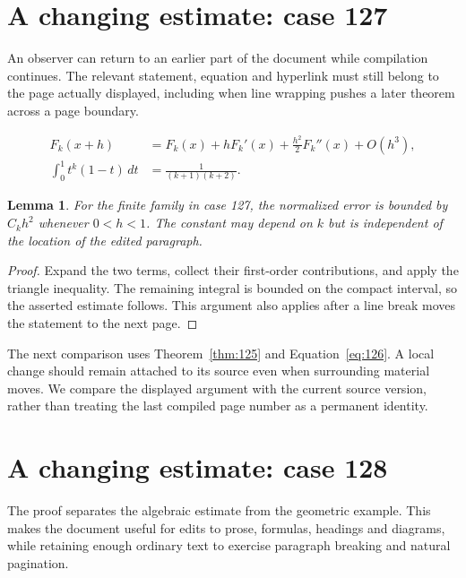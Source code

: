 \documentclass[a4paper,10pt]{article}
\newtheorem{lemma}[theorem]{Lemma}
\begin{document}
\lipsum[3]

\section{A changing estimate: case 127}\label{unit:126}
An observer can return to an earlier part of the document while compilation continues. The relevant statement, equation and hyperlink must still belong to the page actually displayed, including when line wrapping pushes a later theorem across a page boundary.

\lipsum[19-20]
\begin{align}\label{eq:126}
 F_k(x+h)&=F_k(x)+hF_k'(x)+\frac{h^2}{2}F_k''(x)+O(h^3),\\
 \int_0^1 t^k(1-t)\,dt&=\frac{1}{(k+1)(k+2)}.
\end{align}
\begin{lemma}\label{thm:126}
For the finite family in case 127, the normalized error is bounded by $C_k h^2$ whenever $0<h<1$. The constant may depend on $k$ but is independent of the location of the edited paragraph.
\end{lemma}
\begin{proof}
Expand the two terms, collect their first-order contributions, and apply the
triangle inequality. The remaining integral is bounded on the compact interval,
so the asserted estimate follows. This argument also applies after a line break
moves the statement to the next page.
\end{proof}
The next comparison uses Theorem~\ref{thm:125} and Equation~\ref{eq:126}. A local change should remain attached to its source even when surrounding material moves. We compare the displayed argument with the current source version, rather than treating the last compiled page number as a permanent identity.

\lipsum[8]

\section{A changing estimate: case 128}\label{unit:127}
The proof separates the algebraic estimate from the geometric example. This makes the document useful for edits to prose, formulas, headings and diagrams, while retaining enough ordinary text to exercise paragraph breaking and natural pagination.
\end{document}
